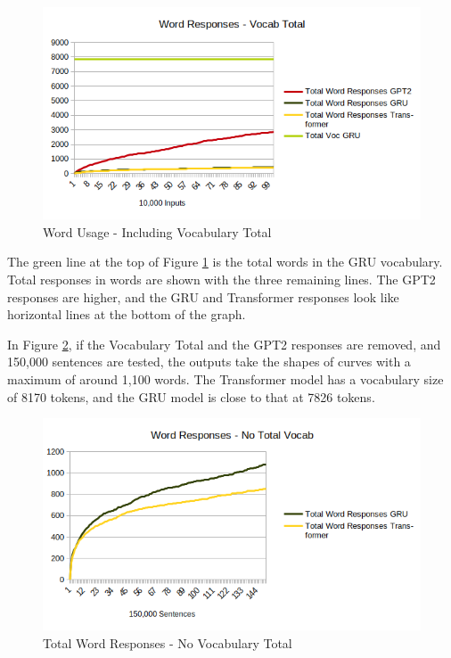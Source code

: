 \begin{figure}[H]
	\begin{center}
		\includegraphics[scale=0.75]{diagram-output-total-responses-01}
		
		
	\end{center}
	\caption[Word Usage]{Word Usage - Including Vocabulary Total}
	\label{diagram-words-with-voc-total}
	
\end{figure}

The green line at the top of Figure \ref{diagram-words-with-voc-total} is the total words in the GRU vocabulary. %
Total responses in words are shown with the three remaining lines. The GPT2 responses are higher, and the GRU and Transformer responses look like horizontal lines at the bottom of the graph.

In Figure \ref{diagram-words-no-voc-total}, if the Vocabulary Total and the GPT2 responses are removed, and 150,000 sentences are tested, the outputs take the shapes of curves with a maximum of around 1,100 words. The Transformer model has a vocabulary size of 8170 tokens, and the GRU model is close to that at 7826 tokens. %


\begin{figure}[H]
	\begin{center}
		\includegraphics[scale=0.75]{diagram-output-total-responses-04}
		
		
	\end{center}
	\caption[Total Word Responses]{Total Word Responses - No Vocabulary Total}
	\label{diagram-words-no-voc-total}
	
\end{figure}

